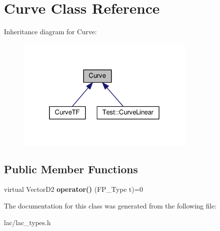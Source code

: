 \hypertarget{classCurve}{}\section{Curve Class Reference}
\label{classCurve}


Inheritance diagram for Curve\+:
\nopagebreak
\begin{figure}[H]
\begin{center}
\leavevmode
\includegraphics[width=248pt]{classCurve__inherit__graph}
\end{center}
\end{figure}
\subsection*{Public Member Functions}
\begin{DoxyCompactItemize}
\item 
\mbox{\label{classCurve_a474b9f54f114e203a285801eefff70e8}} 
virtual Vector\+D2 {\bfseries operator()} (F\+P\+\_\+\+Type t)=0
\end{DoxyCompactItemize}


The documentation for this class was generated from the following file\+:\begin{DoxyCompactItemize}
\item 
lac/lac\+\_\+types.\+h\end{DoxyCompactItemize}
